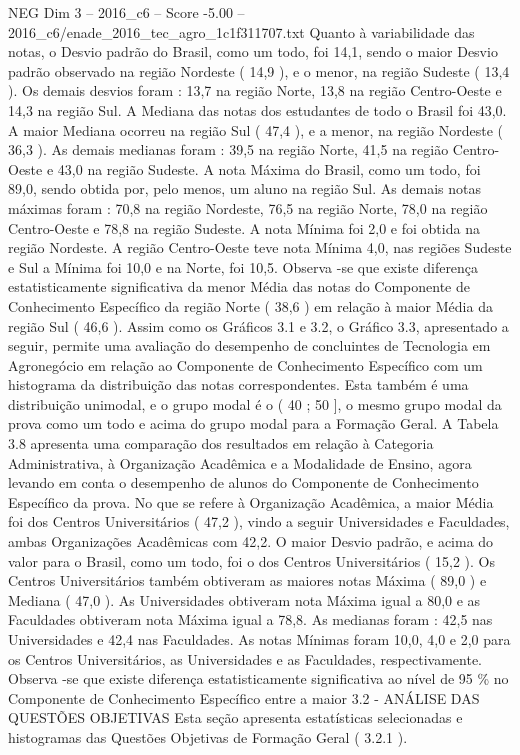 \begin{textsample}{NEG Dim 3 – 2016\_c6 – Score -5.00 – 2016\_c6/enade\_2016\_tec\_agro\_1c1f311707.txt}
Quanto à variabilidade das notas, o Desvio padrão do Brasil, como um todo, foi 14,1, sendo o maior Desvio padrão observado na região Nordeste ( 14,9 ), e o menor, na região Sudeste ( 13,4 ).
Os demais desvios foram : 13,7 na região Norte, 13,8 na região Centro-Oeste e 14,3 na região Sul.
A Mediana das notas dos estudantes de todo o Brasil foi 43,0.
A maior Mediana ocorreu na região Sul ( 47,4 ), e a menor, na região Nordeste ( 36,3 ).
As demais medianas foram : 39,5 na região Norte, 41,5 na região Centro-Oeste e 43,0 na região Sudeste.
A nota Máxima do Brasil, como um todo, foi 89,0, sendo obtida por, pelo menos, um aluno na região Sul.
As demais notas máximas foram : 70,8 na região Nordeste, 76,5 na região Norte, 78,0 na região Centro-Oeste e 78,8 na região Sudeste.
A nota Mínima foi 2,0 e foi obtida na região Nordeste.
A região Centro-Oeste teve nota Mínima 4,0, nas regiões Sudeste e Sul a Mínima foi 10,0 e na Norte, foi 10,5.
Observa -se que existe diferença estatisticamente significativa da menor Média das notas do Componente de Conhecimento Específico da região Norte ( 38,6 ) em relação à maior Média da região Sul ( 46,6 ).
Assim como os Gráficos 3.1 e 3.2, o Gráfico 3.3, apresentado a seguir, permite uma avaliação do desempenho de concluintes de Tecnologia em Agronegócio em relação ao Componente de Conhecimento Específico com um histograma da distribuição das notas correspondentes.
Esta também é uma distribuição unimodal, e o grupo modal é o ( 40 ; 50 ], o mesmo grupo modal da prova como um todo e acima do grupo modal para a Formação Geral.
A Tabela 3.8 apresenta uma comparação dos resultados em relação à Categoria Administrativa, à Organização Acadêmica e a Modalidade de Ensino, agora levando em conta o desempenho de alunos do Componente de Conhecimento Específico da prova.
No que se refere à Organização Acadêmica, a maior Média foi dos Centros Universitários ( 47,2 ), vindo a seguir Universidades e Faculdades, ambas Organizações Acadêmicas com 42,2.
O maior Desvio padrão, e acima do valor para o Brasil, como um todo, foi o dos Centros Universitários ( 15,2 ).
Os Centros Universitários também obtiveram as maiores notas Máxima ( 89,0 ) e Mediana ( 47,0 ).
As Universidades obtiveram nota Máxima igual a 80,0 e as Faculdades obtiveram nota Máxima igual a 78,8.
As medianas foram : 42,5 nas Universidades e 42,4 nas Faculdades.
As notas Mínimas foram 10,0, 4,0 e 2,0 para os Centros Universitários, as Universidades e as Faculdades, respectivamente.
Observa -se que existe diferença estatisticamente significativa ao nível de 95 \% no Componente de Conhecimento Específico entre a maior 3.2 - ANÁLISE DAS QUESTÕES OBJETIVAS Esta seção apresenta estatísticas selecionadas e histogramas das Questões Objetivas de Formação Geral ( 3.2.1 ).

\end{textsample}
